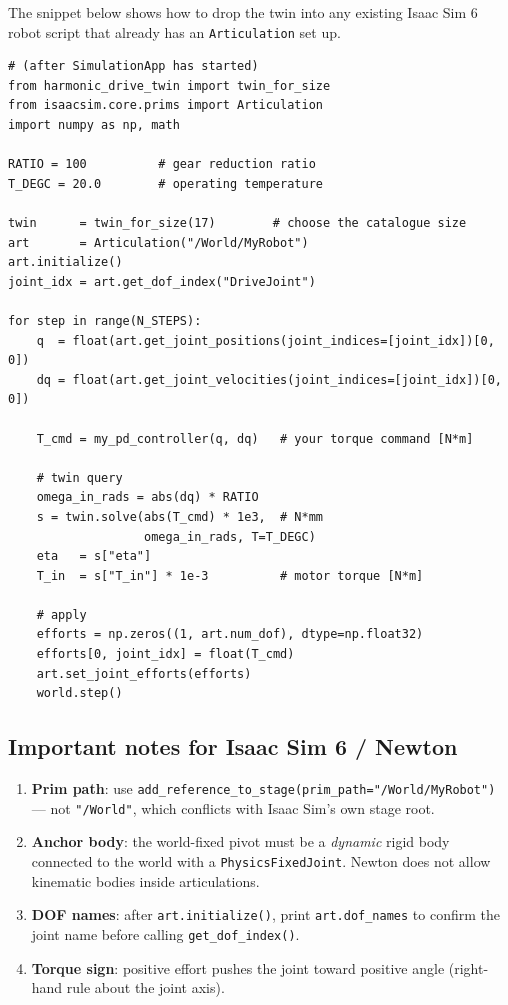 \documentclass[11pt,a4paper]{article}
\begin{document}
The snippet below shows how to drop the twin into any existing Isaac Sim 6
robot script that already has an \texttt{Articulation} set up.

\begin{lstlisting}
# (after SimulationApp has started)
from harmonic_drive_twin import twin_for_size
from isaacsim.core.prims import Articulation
import numpy as np, math

RATIO = 100          # gear reduction ratio
T_DEGC = 20.0        # operating temperature

twin      = twin_for_size(17)        # choose the catalogue size
art       = Articulation("/World/MyRobot")
art.initialize()
joint_idx = art.get_dof_index("DriveJoint")

for step in range(N_STEPS):
    q  = float(art.get_joint_positions(joint_indices=[joint_idx])[0, 0])
    dq = float(art.get_joint_velocities(joint_indices=[joint_idx])[0, 0])

    T_cmd = my_pd_controller(q, dq)   # your torque command [N*m]

    # twin query
    omega_in_rads = abs(dq) * RATIO
    s = twin.solve(abs(T_cmd) * 1e3,  # N*mm
                   omega_in_rads, T=T_DEGC)
    eta   = s["eta"]
    T_in  = s["T_in"] * 1e-3          # motor torque [N*m]

    # apply
    efforts = np.zeros((1, art.num_dof), dtype=np.float32)
    efforts[0, joint_idx] = float(T_cmd)
    art.set_joint_efforts(efforts)
    world.step()
\end{lstlisting}

\subsection{Important notes for Isaac Sim 6 / Newton}

\begin{enumerate}
  \item \textbf{Prim path}: use \texttt{add\_reference\_to\_stage(prim\_path="/World/MyRobot")} —
        not \texttt{"/World"}, which conflicts with Isaac Sim's own stage root.
  \item \textbf{Anchor body}: the world-fixed pivot must be a
        \emph{dynamic} rigid body connected to the world with a
        \texttt{PhysicsFixedJoint}.  Newton does not allow kinematic bodies
        inside articulations.
  \item \textbf{DOF names}: after \texttt{art.initialize()}, print
        \texttt{art.dof\_names} to confirm the joint name before calling
        \texttt{get\_dof\_index()}.
  \item \textbf{Torque sign}: positive effort pushes the joint toward
        positive angle (right-hand rule about the joint axis).
\end{enumerate}
\end{document}
